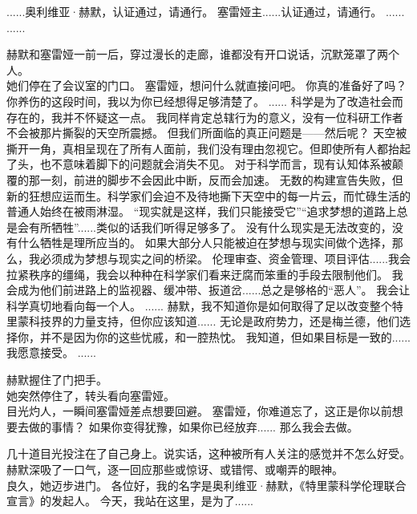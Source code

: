 \documentclass[openany]{book}
\begin{document}
\begin{dialogue}
     ......奥利维亚·赫默，认证通过，请通行。
     塞雷娅主......认证通过，请通行。
     ......
     ......\par
    赫默和塞雷娅一前一后，穿过漫长的走廊，谁都没有开口说话，沉默笼罩了两个人。\\
    她们停在了会议室的门口。
     塞雷娅，想问什么就直接问吧。
     你真的准备好了吗？
     你养伤的这段时间，我以为你已经想得足够清楚了。
     ......
     科学是为了改造社会而存在的，我并不怀疑这一点。
     我同样肯定总辖行为的意义，没有一位科研工作者不会被那片撕裂的天空所震撼。
     但我们所面临的真正问题是——然后呢？
     天空被撕开一角，真相呈现在了所有人面前，我们没有理由忽视它。但即使所有人都抬起了头，也不意味着脚下的问题就会消失不见。
     对于科学而言，现有认知体系被颠覆的那一刻，前进的脚步不会因此中断，反而会加速。
     无数的构建宣告失败，但新的狂想应运而生。科学家们会迫不及待地撕下天空中的每一片云，而忙碌生活的普通人始终在被雨淋湿。
     “现实就是这样，我们只能接受它”“追求梦想的道路上总是会有所牺牲”......类似的话我们听得足够多了。
     没有什么现实是无法改变的，没有什么牺牲是理所应当的。
     如果大部分人只能被迫在梦想与现实间做个选择，那么，我必须成为梦想与现实之间的桥梁。
     伦理审查、资金管理、项目评估......我会拉紧秩序的缰绳，我会以种种在科学家们看来迂腐而笨重的手段去限制他们。
     我会成为他们前进路上的监视器、缓冲带、扳道岔......总之是够格的“恶人”。
     我会让科学真切地看向每一个人。
     ......
     赫默，我不知道你是如何取得了足以改变整个特里蒙科技界的力量支持，但你应该知道......
     无论是政府势力，还是梅兰德，他们选择你，并不是因为你的这些忧戚，和一腔热忱。
     我知道，但如果目标是一致的......
     我愿意接受。
     ......\par
    赫默握住了门把手。\\
    她突然停住了，转头看向塞雷娅。\\
    目光灼人，一瞬间塞雷娅差点想要回避。
     塞雷娅，你难道忘了，这正是你以前想要去做的事情？
     如果你变得犹豫，如果你已经放弃......
     那么我会去做。\par
    几十道目光投注在了自己身上。说实话，这种被所有人关注的感觉并不怎么好受。\\
    赫默深吸了一口气，逐一回应那些或惊讶、或错愕、或嘲弄的眼神。\\
    良久，她迈步进门。
     各位好，我的名字是奥利维亚·赫默，《特里蒙科学伦理联合宣言》的发起人。
     今天，我站在这里，是为了......
\end{dialogue}
\end{document}
